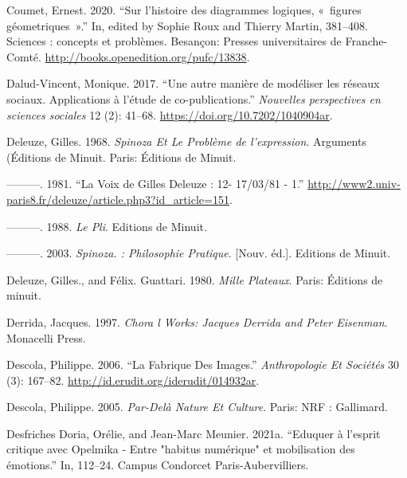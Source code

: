 \documentclass[
  letterpaper,
  DIV=11,
  numbers=noendperiod]{scrreprt}
\newlength{\cslhangindent}
\newlength{\cslentryspacingunit} %
\newenvironment{CSLReferences}[2] %
 {%
  \setlength{\parindent}{0pt}
  \ifodd #1
  \let\oldpar\par
  \def\par{\hangindent=\cslhangindent\oldpar}
  \fi
  \setlength{\parskip}{#2\cslentryspacingunit}
 }%
 {}
\begin{document}
\begin{CSLReferences}{1}{0}
\leavevmode{}%
Coumet, Ernest. 2020. {``Sur l{'}histoire des diagrammes logiques,
«~figures géometriques~».''} In, edited by Sophie Roux and Thierry
Martin, 381--408. Sciences : concepts et problèmes. Besançon: Presses
universitaires de Franche-Comté.
\url{http://books.openedition.org/pufc/13838}.

\leavevmode{}%
Dalud-Vincent, Monique. 2017. {``Une autre manière de modéliser les
réseaux sociaux. Applications à l{'}étude de co-publications.''}
\emph{Nouvelles perspectives en sciences sociales} 12 (2): 41--68.
\url{https://doi.org/10.7202/1040904ar}.

\leavevmode{}%
Deleuze, Gilles. 1968. \emph{Spinoza Et Le Problème de l'expression}.
Arguments (Éditions de Minuit. Paris: Éditions de Minuit.

\leavevmode{}%
---------. 1981. {``La Voix de Gilles Deleuze : 12- 17/03/81 - 1.''}
\url{http://www2.univ-paris8.fr/deleuze/article.php3?id_article=151}.

\leavevmode{}%
---------. 1988. \emph{Le Pli}. Editions de Minuit.

\leavevmode{}%
---------. 2003. \emph{Spinoza. : Philosophie Pratique}. {[}Nouv.
éd.{]}. Editions de Minuit.

\leavevmode{}%
Deleuze, Gilles., and Félix. Guattari. 1980. \emph{Mille Plateaux}.
Paris: Éditions de minuit.

\leavevmode{}%
Derrida, Jacques. 1997. \emph{Chora l Works: Jacques Derrida and Peter
Eisenman}. Monacelli Press.

\leavevmode{}%
Descola, Philippe. 2006. {``La Fabrique Des Images.''}
\emph{Anthropologie Et Sociétés} 30 (3): 167--82.
\url{http://id.erudit.org/iderudit/014932ar}.

\leavevmode{}%
Descola, Philippe. 2005. \emph{Par-Delà Nature Et Culture}. Paris: NRF :
Gallimard.

\leavevmode{}%
Desfriches Doria, Orélie, and Jean-Marc Meunier. 2021a. {``Eduquer à
l'esprit critique avec Opelmika - Entre {"}habitus numérique{"} et
mobilisation des émotions.''} In, 112--24. Campus Condorcet
Paris-Aubervilliers.


\end{CSLReferences}
\end{document}
